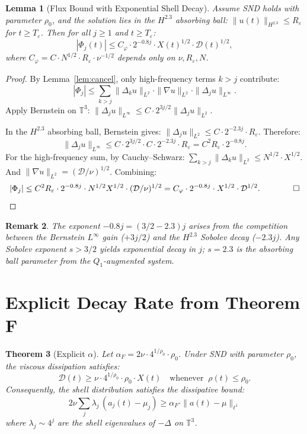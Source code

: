 \documentclass[11pt]{article}
\newtheorem{theorem}{Theorem}[section]
\newtheorem{lemma}[theorem]{Lemma}
\newtheorem{remark}[theorem]{Remark}
\begin{document}
\begin{lemma}[Flux Bound with Exponential Shell Decay]\label{lem:flux}
Assume SND holds with parameter $\rho_0$, and the solution lies in
the $H^{2.3}$ absorbing ball: $\|u(t)\|_{H^{2.3}}\leq R_\varepsilon$ for $t\geq T_\varepsilon$.
Then for all $j\geq 1$ and $t\geq T_\varepsilon$:
\[
|\Phi_j(t)| \leq C_\varphi \cdot 2^{-0.8j} \cdot X(t)^{1/2}\cdot\mathcal{D}(t)^{1/2},
\]
where $C_\varphi = C \cdot N^{1/2}\cdot R_\varepsilon\cdot\nu^{-1/2}$
depends only on $\nu, R_\varepsilon, N$.
\end{lemma}

\begin{proof}
By Lemma~\ref{lem:cancel}, only high-frequency terms $k > j$ contribute:
\[
|\Phi_j| \leq \sum_{k>j}\|\Delta_k u\|_{L^2}\cdot\|\nabla u\|_{L^2}
\cdot\|\Delta_j u\|_{L^\infty}.
\]
Apply Bernstein on $\mathbb{T}^3$:
$\|\Delta_j u\|_{L^\infty} \leq C\cdot 2^{3j/2}\|\Delta_j u\|_{L^2}$.

In the $H^{2.3}$ absorbing ball, Bernstein gives:
$\|\Delta_j u\|_{L^2} \leq C\cdot 2^{-2.3j}\cdot R_\varepsilon$.
Therefore:
\[
\|\Delta_j u\|_{L^\infty} \leq C\cdot 2^{3j/2}\cdot C\cdot 2^{-2.3j}\cdot R_\varepsilon
= C^2 R_\varepsilon\cdot 2^{-0.8j}.
\]
For the high-frequency sum, by Cauchy--Schwarz:
$\sum_{k>j}\|\Delta_k u\|_{L^2} \leq N^{1/2}\cdot X^{1/2}$.
And $\|\nabla u\|_{L^2} = (\mathcal{D}/\nu)^{1/2}$.
Combining:
\[
|\Phi_j| \leq C^2 R_\varepsilon\cdot 2^{-0.8j}\cdot N^{1/2} X^{1/2}\cdot (\mathcal{D}/\nu)^{1/2}
= C_\varphi\cdot 2^{-0.8j}\cdot X^{1/2}\cdot\mathcal{D}^{1/2}. \qquad\qed
\]
\end{proof}

\begin{remark}
The exponent $-0.8j = (3/2 - 2.3)j$ arises from the competition between
the Bernstein $L^\infty$ gain ($+3j/2$) and the $H^{2.3}$ Sobolev decay ($-2.3j$).
Any Sobolev exponent $s > 3/2$ yields exponential decay in $j$; $s = 2.3$
is the absorbing ball parameter from the $Q_1$-augmented system.
\end{remark}

\section{Explicit Decay Rate from Theorem F}

\begin{theorem}[Explicit $\alpha$]\label{thm:alpha}
Let $\alpha_F = 2\nu\cdot 4^{1/\rho_0}\cdot\rho_0$.
Under SND with parameter $\rho_0$, the viscous dissipation satisfies:
\[
\mathcal{D}(t) \geq \nu\cdot 4^{1/\rho_0}\cdot\rho_0\cdot X(t)
\quad\text{whenever }\ \rho(t)\leq\rho_0.
\]
Consequently, the shell distribution satisfies the dissipative bound:
\[
2\nu\sum_j \lambda_j\,(a_j(t)-\mu_j) \geq \alpha_F\cdot\|a(t)-\mu\|_{\ell^1}
\]
where $\lambda_j\sim 4^j$ are the shell eigenvalues of $-\Delta$ on $\mathbb{T}^3$.
\end{theorem}
\end{document}
